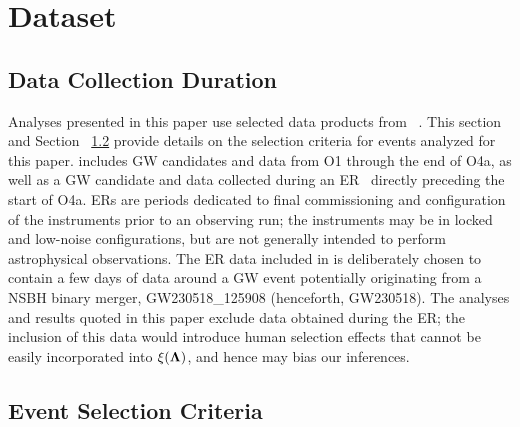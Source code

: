 \section{Dataset}\label{sec:data}

\subsection{Data Collection Duration}
Analyses presented in this paper use selected data products from 
\gwtcfour~\citep{GWTC:Introduction, GWTC:Methods, GWTC:Results, OpenData}.
This section and Section ~\ref{subsec:event_selection} provide details on 
the selection criteria for events analyzed for this paper.
\gwtcfour includes \ac{GW} candidates and data from \ac{O1} through the end of 
\ac{O4a}, as well as a \ac{GW} candidate and data collected during an 
\ac{ER}~\citep{KAGRA:2013rdx} directly preceding the start of \ac{O4a}. 
\Acp{ER} are periods dedicated to final commissioning and configuration of the 
instruments prior to an observing run; the instruments may be in locked and 
low-noise configurations, but are not generally intended to perform astrophysical 
observations.
The \ac{ER} data included in \gwtcfour is deliberately chosen to contain 
a few days of data around a \ac{GW} event potentially originating from a 
\ac{NSBH} binary merger, GW230518\_125908 (henceforth, GW230518).
The analyses and results quoted in this paper exclude data obtained
during the \ac{ER}; the inclusion of this data would 
introduce human selection effects that cannot be easily incorporated
into $\xi(\boldsymbol{\Lambda})$, and hence may bias our inferences. 

\subsection{Event Selection Criteria}
\label{subsec:event_selection}

